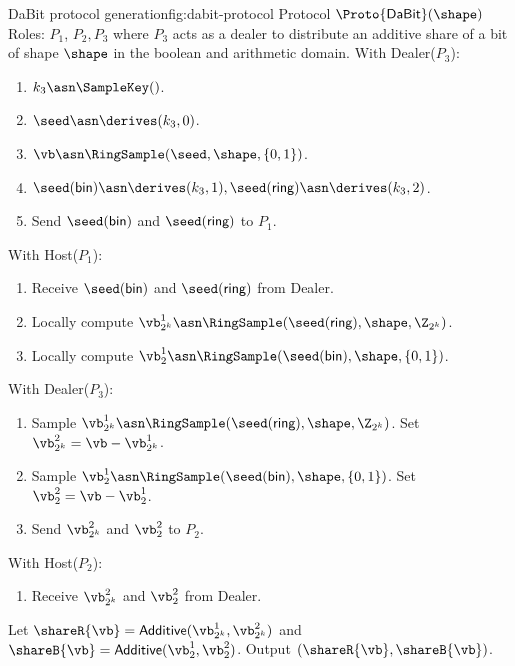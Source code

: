 \begin{Boxfig}{DaBit protocol generation}{fig:dabit-protocol}
  {Protocol $\Proto{\mathsf{DaBit}}(\shape)$}
  Roles: $P_1$, $P_2, P_3$ where $P_3$ acts as a dealer to distribute
  an additive share of a bit of shape $\shape$ in the boolean and arithmetic domain. \newline
  With Dealer($P_3$):
  \begin{enumerate}
    \item $k_3 \asn \SampleKey()$.
    \item $\seed \asn \derives(k_3, 0)$.
    \item $\vb \asn \RingSample(\seed, \shape, \{0, 1\})$.
    \item $\seed(\textsf{bin}) \asn \derives(k_3, 1), \seed(\textsf{ring}) \asn \derives(k_3, 2)$.
    \item Send $\seed(\textsf{bin})$ and $\seed(\textsf{ring})$ to $P_1$.

  \end{enumerate}
 With Host($P_1$):
 \begin{enumerate}
     \item Receive $\seed(\textsf{bin})$ and $\seed(\textsf{ring})$ from Dealer.
     \item Locally compute $\vb^1_{2^k} \asn \RingSample(\seed(\textsf{ring}), \shape, \Z_{2^k})$.
     \item Locally compute $\vb^1_{2} \asn \RingSample(\seed(\textsf{bin}), \shape, \{0, 1\})$.
 \end{enumerate}
With Dealer($P_3$):
\begin{enumerate}
    \item Sample $\vb^1_{2^k} \asn \RingSample(\seed(\textsf{ring}), \shape, \Z_{2^k})$. Set $\vb^2_{2^k} = \vb - \vb^1_{2^k}$.
    \item Sample $\vb^1_{2} \asn \RingSample(\seed(\textsf{bin}), \shape, \{0, 1\})$. Set $\vb^2_{2} = \vb - \vb^1_{2}$. 
    \item Send $\vb^2_{2^k}$ and $\vb^2_2$ to $P_2$.
\end{enumerate}
With Host($P_2$):
\begin{enumerate}
    \item Receive $\vb^2_{2^k}$ and $\vb^2_2$ from Dealer.
\end{enumerate}
Let $\shareR{\vb} = \textsf{Additive}(\vb^1_{2^k}, \vb^2_{2^k})$ and $\shareB{\vb} = \textsf{Additive}(\vb^1_2, \vb^2_2)$. Output $(\shareR{\vb}, \shareB{\vb})$.
\end{Boxfig}

